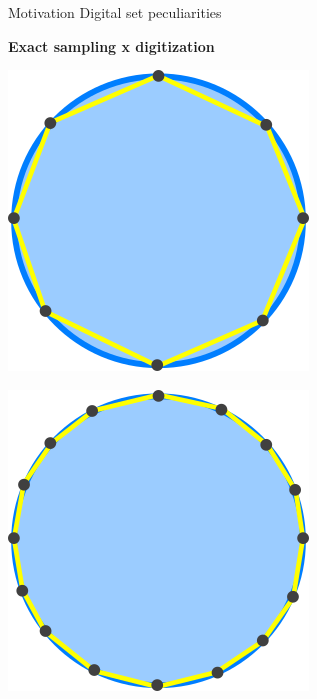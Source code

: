 \begin{frame}
{Motivation}
{Digital set peculiarities}

\textbf{Exact sampling x digitization}

\begin{minipage}{0.33\textwidth}
\center
\includegraphics[scale=0.45]{figures/motivation/exact-sampling/sampling-0.png}
\end{minipage}%
\begin{minipage}{0.33\textwidth}
\center
\includegraphics[scale=0.45]{figures/motivation/exact-sampling/sampling-1.png}
\end{minipage}%
\begin{minipage}{0.33\textwidth}
\center

\end{minipage}
\end{frame}
